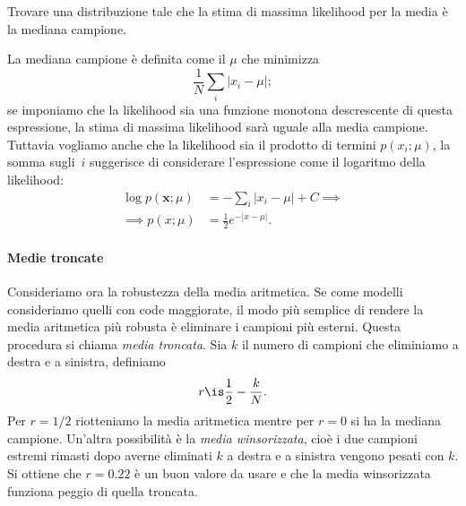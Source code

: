 \begin{exercise}
	Trovare una distribuzione tale che la stima di massima likelihood per la media è la mediana campione.
\end{exercise}

\begin{solution}
	La mediana campione è definita come il $\mu$ che minimizza
	\begin{equation*}
		\frac 1N \sum_i |x_i - \mu|;
	\end{equation*}
	se imponiamo che la likelihood sia una funzione monotona descrescente di questa espressione,
	la stima di massima likelihood sarà uguale alla media campione.
	Tuttavia vogliamo anche che la likelihood sia il prodotto di termini $p(x_i;\mu)$,
	la somma sugli~$i$ suggerisce di considerare l'espressione come il logaritmo della likelihood:
	\begin{align*}
		\log p(\mathbf x;\mu)
		&= -\sum_i |x_i - \mu| + C \implies \\
		\implies p(x;\mu)
		&= \frac12 e^{-|x-\mu|}.
	\end{align*}
\end{solution}


\paragraph{Medie troncate}

Consideriamo ora la robustezza della media aritmetica.
Se come modelli consideriamo quelli con code maggiorate,
il modo più semplice di rendere la media aritmetica più robusta è eliminare i campioni più esterni.
Questa procedura si chiama \emph{media troncata}.
Sia $k$ il numero di campioni che eliminiamo a destra e a sinistra,
definiamo
\begin{equation*}
	r \is \frac12 - \frac kN.
\end{equation*}
Per $r=1/2$ riotteniamo la media aritmetica mentre per $r=0$ si ha la mediana campione.
Un'altra possibilità è la \emph{media winsorizzata},
cioè i due campioni estremi rimasti dopo averne eliminati $k$ a destra e a sinistra vengono pesati con $k$.
Si ottiene che $r=0.22$ è un buon valore da usare e che la media winsorizzata funziona peggio di quella troncata.
%

